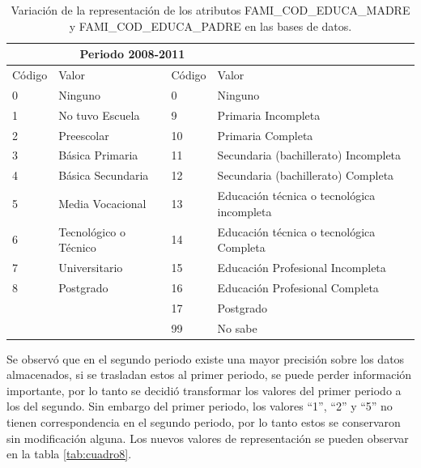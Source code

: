 \begin{itemize}
\begin{table}[!htb]
\centering
\begin{tabular}{|p{1.5cm}|p{6.5cm}|p{1.5cm}|p{6.5cm}|}
\hline
	\rowcolor[gray]{0.9} 
	\multicolumn{2}{|c|}{
	\textbf{Periodo 2000-2004I}} &
	\multicolumn{2}{|c|}{
	\textbf{Periodo 2008-2011}}\\
\hline
	\rowcolor[gray]{0.5}
	Código  & Valor &
	Código  & Valor \\
\hline
0 & Ninguno & 0 & Ninguno\\
\hline
1 & No tuvo Escuela & 9 & Primaria Incompleta\\
\hline
2 & Preescolar & 10 & Primaria Completa\\
\hline
3 & Básica Primaria & 11 & Secundaria (bachillerato) Incompleta\\
\hline
4 & Básica Secundaria & 12 & Secundaria (bachillerato) Completa\\
\hline
5 & Media Vocacional & 13 & Educación técnica o tecnológica incompleta\\
\hline
6 & Tecnológico o Técnico & 14 & Educación técnica o tecnológica Completa\\
\hline
7 & Universitario & 15 & Educación Profesional Incompleta\\ 
\hline
8 & Postgrado & 16 & Educación Profesional Completa\\
\hline
& & 17 & Postgrado\\
\hline
& & 99 & No sabe\\
\hline
\end{tabular}
\caption{Variación de la representación de los atributos FAMI\_COD\_EDUCA\_MADRE y FAMI\_COD\_EDUCA\_PADRE en las bases de datos.}
\label{tab:cuadro7}
\end{table}
Se observó que en el segundo periodo existe una mayor precisión sobre los datos almacenados, si se trasladan estos al primer periodo, se puede perder información importante, por lo tanto se decidió  transformar los valores del primer periodo a los del segundo. Sin embargo del primer periodo, los valores ``1'', ``2'' y ``5'' no tienen correspondencia en el segundo periodo, por lo tanto estos se conservaron sin modificación alguna. Los nuevos valores de representación se pueden observar en la tabla \ref{tab:cuadro8}.


\end{itemize}
